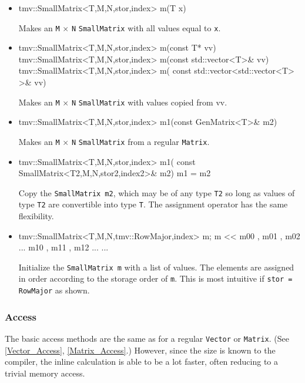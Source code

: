\documentclass[twoside,letterpaper,11pt]{article}
\renewcommand{\tt}[1]{{\lstinline {#1}}}
\begin{document}
\begin{itemize}
\item
\begin{tmvcode}
tmv::SmallMatrix<T,M,N,stor,index> m(T x)
\end{tmvcode}
Makes an \tt{M} $\times$ \tt{N} \tt{SmallMatrix} with all values equal to \tt{x}.

\item
\begin{tmvcode}
tmv::SmallMatrix<T,M,N,stor,index> m(const T* vv)
tmv::SmallMatrix<T,M,N,stor,index> m(const std::vector<T>& vv)
tmv::SmallMatrix<T,M,N,stor,index> m(
      const std::vector<std::vector<T> >& vv)
\end{tmvcode}
Makes an \tt{M} $\times$ \tt{N} \tt{SmallMatrix} with values copied from vv.

\item 
\begin{tmvcode}
tmv::SmallMatrix<T,M,N,stor,index> m1(const GenMatrix<T>& m2)
\end{tmvcode}
Makes an \tt{M} $\times$ \tt{N} \tt{SmallMatrix} from a regular \tt{Matrix}.

\item
\begin{tmvcode}
tmv::SmallMatrix<T,M,N,stor,index> m1(
      const SmallMatrix<T2,M,N,stor2,index2>& m2)
m1 = m2
\end{tmvcode}
Copy the \tt{SmallMatrix m2}, which may be of any type \tt{T2} so long
as values of type \tt{T2} are convertible into type \tt{T}.
The assignment operator has the same flexibility.

\item
\begin{tmvcode}
tmv::SmallMatrix<T,M,N,tmv::RowMajor,index> m;
m << m00 , m01 , m02 ...
     m10 , m11 , m12 ...
     ...
\end{tmvcode}
Initialize the \tt{SmallMatrix m} with a list of values.  The elements are assigned
in order according to the storage order of \tt{m}.  This is most intuitive if \tt{stor = RowMajor}
as shown.

\end{itemize}


\subsubsection{Access}
\label{SmallMatrix_Access}

The basic access methods are the same as for a regular \tt{Vector} or \tt{Matrix}.
(See \ref{Vector_Access}, \ref{Matrix_Access}.)
However, since the size is known to the compiler, the inline calculation is able
to be a lot faster, often reducing to a trivial memory access.
\end{document}
